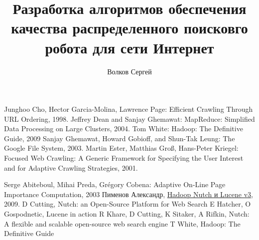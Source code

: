 \documentclass[a4paper,10pt]{report}
\title{Разработка алгоритмов обеспечения качества распределенного поисковго робота для сети Интернет}
\author{Волков Сергей}
\begin{document}
\maketitle




%
%

\begin{thebibliography}{9}
 Junghoo Cho, Hector Garcia-Molina, Lawrence Page: Efficient Crawling Through URL Ordering, 1998.
 Jeffrey Dean and Sanjay Ghemawat: MapReduce: Simplified Data Processing on Large Clusters, 2004.
 Tom White: Hadoop: The Definitive Guide, 2009
 Sanjay Ghemawat, Howard Gobioff, and Shun-Tak Leung: The Google File System, 2003.
 Martin Ester, Matthias Groß, Hans-Peter Kriegel: Focused Web Crawling: A Generic Framework for Specifying the User Interest and for Adaptive Crawling Strategies, 2001.

 Serge Abiteboul, Mihai Preda, Grégory Cobena: Adaptive On-Line Page Importance Computation, 2003
 Пименов Александр, \href{http://mmcg.z52.ru/drupal/node/3}{Hadoop Nutch и Lucene v3}, 2009.
 D Cutting, Nutch: an Open-Source Platform for Web Search
 E Hatcher, O Gospodnetic, Lucene in action
 R Khare, D Cutting, K Sitaker, A Rifkin, Nutch: A flexible and scalable open-source web search engine
 T White, Hadoop: The Definitive Guide

\end{thebibliography}
\end{document}
